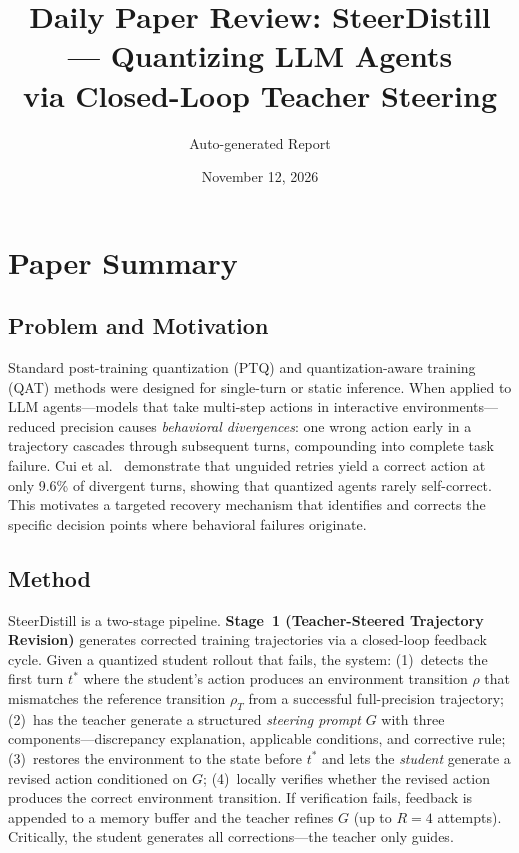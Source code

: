 \documentclass[11pt,a4paper]{article}
\title{Daily Paper Review: SteerDistill --- Quantizing LLM Agents\\via Closed-Loop Teacher Steering}
\author{Auto-generated Report}
\date{November 12, 2026}
\begin{document}
\maketitle

\section{Paper Summary}

\subsection{Problem and Motivation}
Standard post-training quantization (PTQ) and quantization-aware training (QAT) methods were designed for single-turn or static inference. When applied to LLM agents---models that take multi-step actions in interactive environments---reduced precision causes \emph{behavioral divergences}: one wrong action early in a trajectory cascades through subsequent turns, compounding into complete task failure. Cui et al.~\cite{cui2026steerdistill} demonstrate that unguided retries yield a correct action at only 9.6\% of divergent turns, showing that quantized agents rarely self-correct. This motivates a targeted recovery mechanism that identifies and corrects the specific decision points where behavioral failures originate.

\subsection{Method}
SteerDistill is a two-stage pipeline. \textbf{Stage~1 (Teacher-Steered Trajectory Revision)} generates corrected training trajectories via a closed-loop feedback cycle. Given a quantized student rollout that fails, the system: (1)~detects the first turn $t^*$ where the student's action produces an environment transition $\rho$ that mismatches the reference transition $\rho_T$ from a successful full-precision trajectory; (2)~has the teacher generate a structured \emph{steering prompt} $G$ with three components---discrepancy explanation, applicable conditions, and corrective rule; (3)~restores the environment to the state before $t^*$ and lets the \emph{student} generate a revised action conditioned on $G$; (4)~locally verifies whether the revised action produces the correct environment transition. If verification fails, feedback is appended to a memory buffer and the teacher refines $G$ (up to $R{=}4$ attempts). Critically, the student generates all corrections---the teacher only guides.
\end{document}
